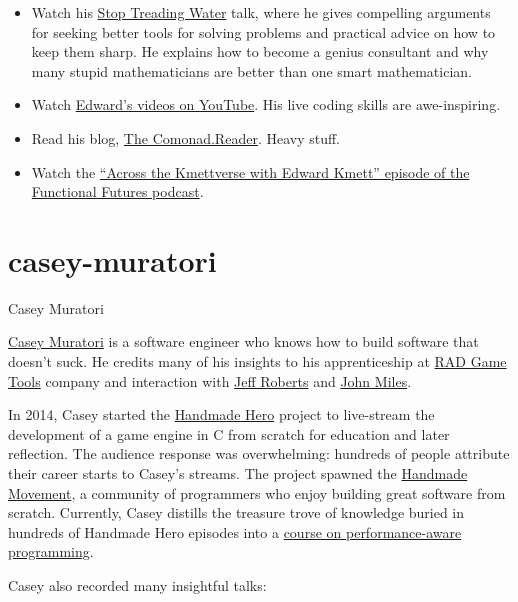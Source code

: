 \documentclass{article}
\begin{document}
\begin{itemize}
\item Watch his \href{https://youtu.be/j0XmixCsWjs}{Stop Treading Water} talk, where he gives compelling arguments for seeking better tools for solving problems and practical advice on how to keep them sharp. He explains how to become a genius consultant and why many stupid mathematicians are better than one smart mathematician.
\item Watch \href{https://www.youtube.com/@ekmett}{Edward's videos on YouTube}. His live coding skills are awe-inspiring.
\item Read his blog, \href{http://comonad.com/reader/}{The Comonad.Reader}. Heavy stuff.
\item Watch the \href{https://youtu.be/jZrCVp5ekbA?si=rBOp2FIoJ5NEu5mI}{``Across the Kmettverse with Edward Kmett'' episode of the Functional Futures podcast}.
\end{itemize}

\section{casey-muratori}{Casey Muratori}

\href{https://caseymuratori.com/about}{Casey Muratori} is a software engineer who knows how to build software that doesn't suck.
He credits many of his insights to his apprenticeship at \href{https://www.radgametools.com/}{RAD Game Tools} company and interaction with \href{https://github.com/jeffrbig2}{Jeff Roberts} and \href{https://rawg.io/creators/john-miles}{John Miles}.

In 2014, Casey started the \href{https://guide.handmadehero.org/}{Handmade Hero} project to live-stream the development of a game engine in C from scratch for education and later reflection.
The audience response was overwhelming: hundreds of people attribute their career starts to Casey's streams.
The project spawned the \href{https://handmade.network/manifesto}{Handmade Movement}, a community of programmers who enjoy building great software from scratch.
Currently, Casey distills the treasure trove of knowledge buried in hundreds of Handmade Hero episodes into a \href{https://www.computerenhance.com/p/table-of-contents}{course on performance-aware programming}.

Casey also recorded many insightful talks:
\end{document}
